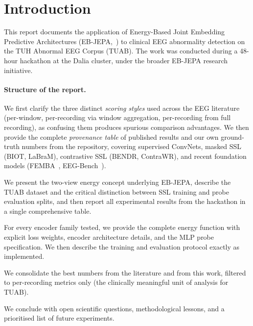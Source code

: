 \documentclass[11pt,a4paper]{article}
\begin{document}
\section*{Introduction}
\label{sec:intro}

This report documents the application of Energy-Based Joint Embedding Predictive
Architectures (EB-JEPA,~\cite{ebjepa_lib}) to clinical EEG abnormality detection on
the TUH Abnormal EEG Corpus (TUAB).  The work was conducted during a 48-hour
hackathon at the Dalia cluster, under the broader EB-JEPA research initiative.

\paragraph{Structure of the report.}
\begin{description}[noitemsep]
  \item[Section~\ref{sec:sota}: State of the Art.]
    We first clarify the three distinct \emph{scoring styles} used across the EEG
    literature (per-window, per-recording via window aggregation, per-recording from
    full recording), as confusing them produces spurious comparison advantages.
    We then provide the complete \emph{provenance table} of published results and
    our own ground-truth numbers from the repository, covering supervised ConvNets,
    masked SSL (BIOT, LaBraM), contrastive SSL (BENDR, ContraWR), and recent
    foundation models (FEMBA~\cite{femba}, EEG-Bench~\cite{eeg_bench}).

  \item[Section~\ref{sec:jepa}: EB-JEPA Results.]
    We present the two-view energy concept underlying EB-JEPA, describe the TUAB
    dataset and the critical distinction between SSL training and probe evaluation
    splits, and then report all experimental results from the hackathon in a single
    comprehensive table.

  \item[Section~\ref{sec:math}: Per-Model Mathematical Descriptions.]
    For every encoder family tested, we provide the complete energy function with
    explicit loss weights, encoder architecture details, and the MLP probe
    specification.  We then describe the training and evaluation protocol exactly
    as implemented.

  \item[Section~\ref{sec:best}: Combined Best Results.]
    We consolidate the best numbers from the literature and from this work,
    filtered to per-recording metrics only (the clinically meaningful unit of
    analysis for TUAB).

  \item[Section~\ref{sec:conclusion}: Conclusion and Future Work.]
    We conclude with open scientific questions, methodological lessons, and
    a prioritised list of future experiments.
\end{description}
\end{document}
